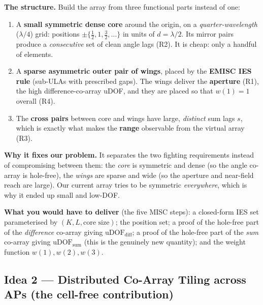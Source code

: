 \documentclass[11pt]{article}
\begin{document}
\begin{ideabox}
\textbf{The structure.} Build the array from three functional parts instead of one:
\begin{enumerate}
\item A \textbf{small symmetric dense core} around the origin, on a \emph{quarter-wavelength}
($\lambda/4$) grid: positions $\pm\{\tfrac{1}{2},1,\tfrac{3}{2},\dots\}$ in units of
$d=\lambda/2$. Its mirror pairs produce a \emph{consecutive} set of clean angle lags (R2). It is
cheap: only a handful of elements.
\item A \textbf{sparse asymmetric outer pair of wings}, placed by the \textbf{EMISC IES rule}
(sub-ULAs with prescribed gaps). The wings deliver the \textbf{aperture} (R1), the high
difference-co-array uDOF, and they are placed so that $w(1)=1$ overall (R4).
\item The \textbf{cross pairs} between core and wings have large, \emph{distinct} sum lags $s$, which
is exactly what makes the \textbf{range} observable from the virtual array (R3).
\end{enumerate}
\textbf{Why it fixes our problem.} It separates the two fighting requirements instead of compromising
between them: the \emph{core} is symmetric and dense (so the angle co-array is hole-free), the
\emph{wings} are sparse and wide (so the aperture and near-field reach are large). Our current
array tries to be symmetric \emph{everywhere}, which is why it ended up small and low-DOF.
\end{ideabox}

\textbf{What you would have to deliver} (the five MISC steps): a closed-form IES set parameterised by
$(K, L, \text{core size})$; the position set; a proof of the hole-free part of the \emph{difference}
co-array giving $\mathrm{uDOF}_{\mathrm{diff}}$; a proof of the hole-free part of the \emph{sum}
co-array giving $\mathrm{uDOF}_{\mathrm{sum}}$ (this is the genuinely new quantity); and the weight
function $w(1),w(2),w(3)$.

\subsection{Idea 2 --- Distributed Co-Array Tiling across APs (the cell-free contribution)}
\end{document}
